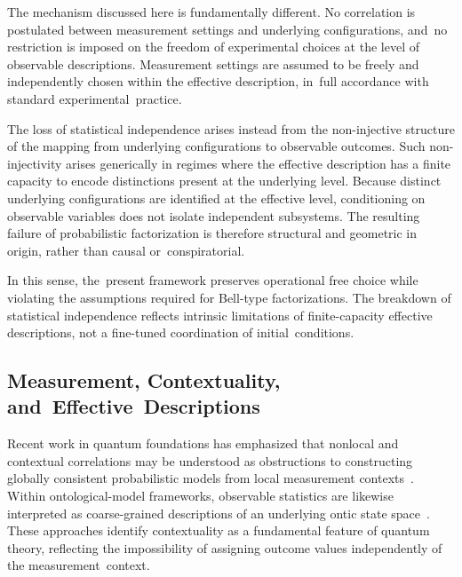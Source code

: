 \documentclass[11pt,a4paper]{article}
\theoremstyle{remark}
\begin{document}
    The mechanism discussed here is fundamentally different.
    No correlation is postulated between measurement settings and underlying
    configurations, and~no restriction is imposed on the freedom of experimental choices
    at the level of observable descriptions.
    Measurement settings are assumed to be freely and independently chosen within the
    effective description, in~full accordance with standard experimental~practice.

    The loss of statistical independence arises instead from the non-injective structure
    of the mapping from underlying configurations to observable outcomes.
    Such non-injectivity arises generically in regimes where the effective description
    has a finite capacity to encode distinctions present at the underlying level.
    Because distinct underlying configurations are identified at the effective level,
    conditioning on observable variables does not isolate independent subsystems.
    The resulting failure of probabilistic factorization is therefore structural and
    geometric in origin, rather than causal or~conspiratorial.

    In this sense, the~present framework preserves operational free choice while violating
    the assumptions required for Bell-type factorizations.
    The breakdown of statistical independence reflects intrinsic limitations of
    finite-capacity effective descriptions, not a fine-tuned coordination of initial~conditions.

  \subsection{Measurement, Contextuality, and~Effective~Descriptions}
    \label{subsec:contextuality}

    Recent work in quantum foundations has emphasized that nonlocal and contextual
    correlations may be understood as obstructions to constructing globally consistent
    probabilistic models from local measurement contexts~\cite{AbramskyBrandenburger2011}.
    Within ontological-model frameworks, observable statistics are likewise interpreted
    as coarse-grained descriptions of an underlying ontic state space~\cite{Spekkens2007Epistemic}.
    These approaches identify contextuality as a fundamental feature of quantum theory,
    reflecting the impossibility of assigning outcome values independently of the
    measurement~context.
\end{document}
